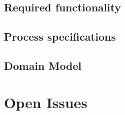 \documentclass[hidelinks, 12pt, oneside]{article}
\begin{document}
\subsection{Required functionality}
\subsection{Process specifications}
\subsection{Domain Model}
\section{Open Issues}


  
\end{document}
